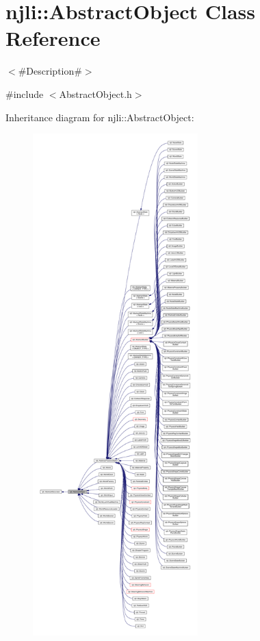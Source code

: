 \hypertarget{classnjli_1_1_abstract_object}{}\section{njli\+:\+:Abstract\+Object Class Reference}
\label{classnjli_1_1_abstract_object}


$<$\#\+Description\#$>$  




{\ttfamily \#include $<$Abstract\+Object.\+h$>$}



Inheritance diagram for njli\+:\+:Abstract\+Object\+:\nopagebreak
\begin{figure}[H]
\begin{center}
\leavevmode
\includegraphics[height=550pt]{classnjli_1_1_abstract_object__inherit__graph}
\end{center}
\end{figure}


